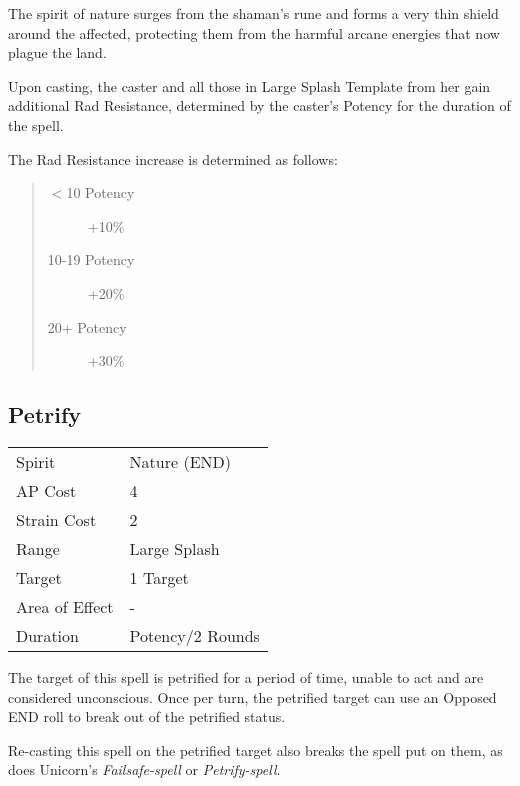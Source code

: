 \documentclass[11pt,a4paper,twocolumn]{book}
\begin{document}
The spirit of nature surges from the shaman's rune and forms a very thin shield around the affected, protecting them from the harmful arcane energies that now plague the land.

Upon casting, the caster and all those in Large Splash Template from her gain additional Rad Resistance, determined by the caster's Potency for the duration of the spell. 

\newpage

The Rad Resistance increase is determined as follows:
\begin{quote}
	\begin{description}
		\item[$<$10 Potency] 	+10\%
		\item[10-19 Potency] 	+20\%
		\item[20+ Potency]  	+30\%
	\end{description}	
\end{quote}


\subsection*{Petrify}
{
	\begin{tabu} to 70mm{| X[l,4] | X[l,7] |}
		\hline
		Spirit         & Nature (END)          \\
		AP Cost        & 4                     \\
		Strain Cost    & 2                     \\
		Range          & Large Splash          \\
		Target         & 1 Target              \\
		Area of Effect & -                     \\
		Duration       & Potency/2 Rounds \\ \hline
	\end{tabu}
	
}
\medskip

The target of this spell is petrified for a period of time, unable to act and are considered unconscious. Once per turn, the petrified target can use an Opposed END roll to break out of the petrified status. 

Re-casting this spell on the petrified target also breaks the spell put on them, as does Unicorn's \textit{Failsafe-spell} or \textit{Petrify-spell}.
\end{document}
